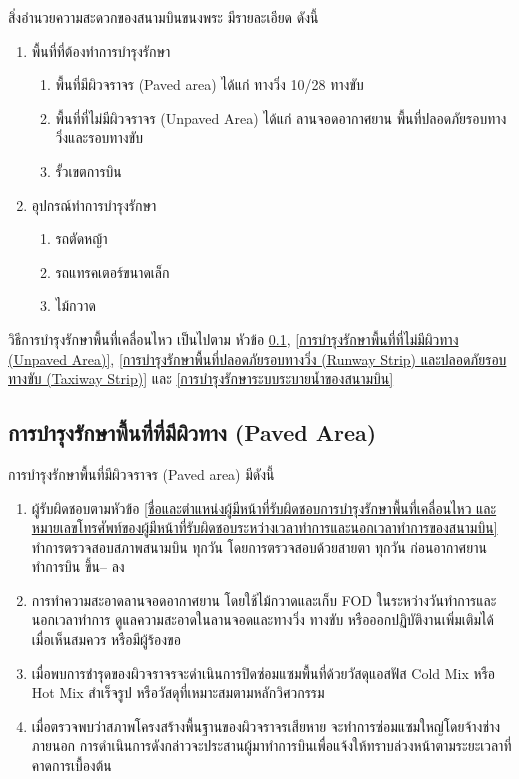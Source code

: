 สิ่งอำนวยความสะดวกของสนามบินขนงพระ มีรายละเอียด ดังนี้

\begin{enumerate}
\item พื้นที่ที่ต้องทำการบำรุงรักษา
	\begin{enumerate}
	\item พื้นที่มีผิวจราจร (Paved area) ได้แก่ ทางวิ่ง 10/28 ทางขับ
	\item พื้นที่ที่ไม่มีผิวจราจร (Unpaved Area) ได้แก่ ลานจอดอากาศยาน พื้นที่ปลอดภัยรอบทางวิ่งและรอบทางขับ
	\item รั้วเขตการบิน
	\end{enumerate}
\item อุปกรณ์ทำการบำรุงรักษา
	\begin{enumerate}
	\item รถตัดหญ้า
	\item รถแทรคเตอร์ขนาดเล็ก
	\item ไม้กวาด
	\end{enumerate}
\end{enumerate}

วิธีการบำรุงรักษาพื้นที่เคลื่อนไหว เป็นไปตาม หัวข้อ \ref{การบำรุงรักษาพื้นที่ที่มีผิวทาง (Paved Area)}, \ref{การบำรุงรักษาพื้นที่ที่ไม่มีผิวทาง (Unpaved Area)},  \ref{การบำรุงรักษาพื้นที่ปลอดภัยรอบทางวิ่ง (Runway Strip) และปลอดภัยรอบทางขับ (Taxiway Strip)} และ \ref{การบำรุงรักษาระบบระบายน้ำของสนามบิน}

\subsection{การบำรุงรักษาพื้นที่ที่มีผิวทาง (Paved Area)} \label{การบำรุงรักษาพื้นที่ที่มีผิวทาง (Paved Area)}

การบำรุงรักษาพื้นที่มีผิวจราจร (Paved area) มีดังนี้

\begin{enumerate}
\item ผู้รับผิดชอบตามหัวข้อ \ref{ชื่อและตำแหน่งผู้มีหน้าที่รับผิดชอบการบำรุงรักษาพื้นที่เคลื่อนไหว และหมายเลขโทรศัพท์ของผู้มีหน้าที่รับผิดชอบระหว่างเวลาทำการและนอกเวลาทำการของสนามบิน} ทำการตรวจสอบสภาพสนามบิน ทุกวัน โดยการตรวจสอบด้วยสายตา ทุกวัน ก่อนอากาศยานทำการบิน ขึ้น– ลง
\item การทำความสะอาดลานจอดอากาศยาน โดยใช้ไม้กวาดและเก็บ FOD ในระหว่างวันทำการและนอกเวลาทำการ ดูแลความสะอาดในลานจอดและทางวิ่ง ทางขับ หรือออกปฏิบัติงานเพิ่มเติมได้เมื่อเห็นสมควร หรือมีผู้ร้องขอ
\item เมื่อพบการชำรุดของผิวจราจรจะดำเนินการปิดซ่อมแซมพื้นที่ด้วยวัสดุแอสฟัส Cold Mix หรือ Hot Mix สำเร็จรูป หรือวัสดุที่เหมาะสมตามหลักวิศวกรรม
\item เมื่อตรวจพบว่าสภาพโครงสร้างพื้นฐานของผิวจราจรเสียหาย จะทำการซ่อมแซมใหญ่โดยจ้างช่างภายนอก การดำเนินการดังกล่าวจะประสานผู้มาทำการบินเพื่อแจ้งให้ทราบล่วงหน้าตามระยะเวลาที่คาดการเบื้องต้น
\end{enumerate}

